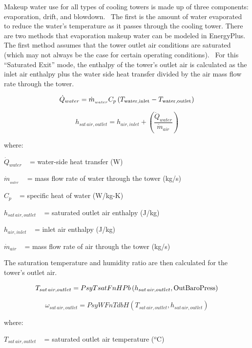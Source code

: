 Makeup water use for all types of cooling towers is made up of three components: evaporation, drift, and blowdown. ~The first is the amount of water evaporated to reduce the water's temperature as it passes through the cooling tower. There are two methods that evaporation makeup water can be modeled in EnergyPlus.~ The first method assumes that the tower outlet air conditions are saturated (which may not always be the case for certain operating conditions). ~For this ``Saturated Exit'' mode, the enthalpy of the tower's outlet air is calculated as the inlet air enthalpy plus the water side heat transfer divided by the air mass flow rate through the tower.

\begin{equation}
{\dot Q_{water}} = {\dot m_{_{water}}}{C_p}\left( {{T_{{\rm{water,inlet}}}} - {T_{{\rm{water,outlet}}}}} \right)
\end{equation}

\begin{equation}
{h_{sat\,air,outlet}} = {h_{air,inlet}} + \left( {\frac{{{{\dot Q}_{water}}}}{{{{\dot m}_{air}}}}} \right)
\end{equation}

where:

\({\dot Q_{water}}\) ~ = water-side heat transfer (W)

\({\dot m_{_{water}}}\) ~ = mass flow rate of water through the tower (kg/s)

\({C_p}\) ~ = specific heat of water (W/kg-K)

\({h_{sat\,air,outlet}}\) ~ = saturated outlet air enthalpy (J/kg)

\({h_{air,inlet}}\) ~ = inlet air enthalpy (J/kg)

\({\dot m_{air}}\) ~ = mass flow rate of air through the tower (kg/s)

The saturation temperature and humidity ratio are then calculated for the tower's outlet air.

\begin{equation}
{T_{sat\,air,outlet}} = PsyTsatFnHPb\left( {{h_{sat\,air,outlet}},{\rm{OutBaroPress}}} \right)
\end{equation}

\begin{equation}
{\omega_{sat\,air,outlet}} = PsyWFnTdbH\left( {{T_{sat\,air,outlet}},{h_{sat\,air,outlet}}} \right)
\end{equation}

where:

\({T_{sat\,air,outlet}}\) ~ = saturated outlet air temperature (\(^{o}\)C)

